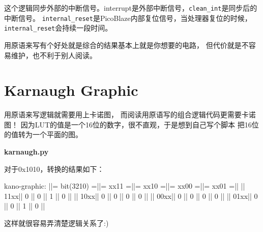 这个逻辑同步外部的中断信号。interrupt是外部中断信号，\verb|clean_int|是同步后的中断信号。 \verb|internal_reset|是PicoBlaze内部复位信号，当处理器复位的时候，\verb|internal_reset|会持续一段时间。

用原语来写有个好处就是综合的结果基本上就是你想要的电路，
但代价就是不容易维护，也不利于别人阅读。

\clearpage
\section{Karnaugh Graphic}
用原语来写逻辑就需要用上卡诺图，
而阅读用原语写的组合逻辑代码更需要卡诺图！
因为LUT的值是一个16位的数字，很不直观，于是想到自己写个脚本
把16位的值转为一个平面的图。

\textbf{karnaugh.py}


对于0x1010，转换的结果如下：
\begin{textcode}
kano-graphic:
||= bit(3210) =||=  xx11 =||=  xx10 =||=  xx00 =||=  xx01 =||
||         11xx||      0  ||      0  ||      1  ||      0  ||
||         10xx||      0  ||      0  ||      0  ||      0  ||
||         00xx||      0  ||      0  ||      0  ||      0  ||
||         01xx||      0  ||      0  ||      1  ||      0  ||
\end{textcode}
这样就很容易弄清楚逻辑关系了:)

